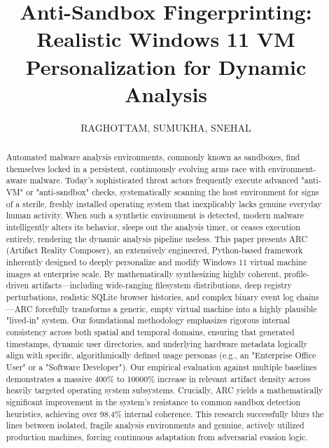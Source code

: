 \documentclass{ieeeaccess}
\begin{document}

\title{Anti-Sandbox Fingerprinting: Realistic Windows 11 VM Personalization for Dynamic Analysis}

\author{\uppercase{Raghottam},
\uppercase{Sumukha},
\uppercase{Snehal}}

\address[1]{Department of Computer Science and Engineering, RV College of Engineering, Bengaluru, India}


\begin{abstract}
Automated malware analysis environments, commonly known as sandboxes, find themselves locked in a persistent, continuously evolving arms race with environment-aware malware. Today's sophisticated threat actors frequently execute advanced "anti-VM" or "anti-sandbox" checks, systematically scanning the host environment for signs of a sterile, freshly installed operating system that inexplicably lacks genuine everyday human activity. When such a synthetic environment is detected, modern malware intelligently alters its behavior, sleeps out the analysis timer, or ceases execution entirely, rendering the dynamic analysis pipeline useless. This paper presents ARC (Artifact Reality Composer), an extensively engineered, Python-based framework inherently designed to deeply personalize and modify Windows 11 virtual machine images at enterprise scale. By mathematically synthesizing highly coherent, profile-driven artifacts—including wide-ranging filesystem distributions, deep registry perturbations, realistic SQLite browser histories, and complex binary event log chains—ARC forcefully transforms a generic, empty virtual machine into a highly plausible "lived-in" system. Our foundational methodology emphasizes rigorous internal consistency across both spatial and temporal domains, ensuring that generated timestamps, dynamic user directories, and underlying hardware metadata logically align with specific, algorithmically defined usage personas (e.g., an "Enterprise Office User" or a "Software Developer"). Our empirical evaluation against multiple baselines demonstrates a massive 400\% to 10000\% increase in relevant artifact density across heavily targeted operating system subsystems. Crucially, ARC yields a mathematically significant improvement in the system's resistance to common sandbox detection heuristics, achieving over 98.4\% internal coherence. This research successfully blurs the lines between isolated, fragile analysis environments and genuine, actively utilized production machines, forcing continuous adaptation from adversarial evasion logic.
\end{abstract}
\end{document}
